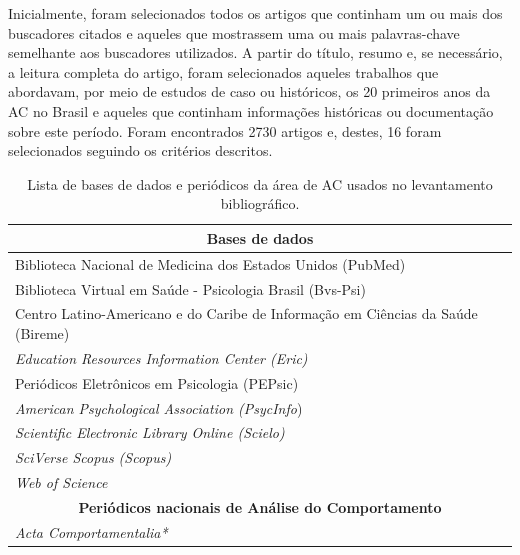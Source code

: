 Inicialmente, foram selecionados todos os artigos que continham um ou mais dos buscadores citados e aqueles que mostrassem uma ou mais palavras-chave semelhante aos buscadores utilizados. A partir do título, resumo e, se necessário, a leitura completa do artigo, foram selecionados aqueles trabalhos que abordavam, por meio de estudos de caso ou históricos, os 20 primeiros anos da AC no Brasil e aqueles que continham informações históricas ou documentação sobre este período. Foram encontrados 2730 artigos e, destes, 16 foram selecionados seguindo os critérios descritos.

\begin{table}[tbp]
    \caption{Lista de bases de dados e periódicos da área de AC usados no levantamento bibliográfico.}
    \label{tabela011}
    \begin{adjustbox}{max width=1\textwidth}
    \begin{tabular}{@{}l@{}}
    \toprule
    \multicolumn{1}{c}{\textbf{Bases de dados}}                                     \\ \midrule
    Biblioteca Nacional de Medicina dos Estados Unidos (PubMed)                     \\
    Biblioteca Virtual em Saúde - Psicologia Brasil (Bvs-Psi)                       \\
    Centro Latino-Americano e do Caribe de Informação em Ciências da	Saúde (Bireme) \\
    \textit{Education Resources Information Center  (Eric)}                                  \\
    Periódicos Eletrônicos em Psicologia (PEPsic)                                   \\
    \textit{American Psychological Association (PsycInfo})                                   \\
    \textit{Scientific	Electronic Library Online (Scielo) }                                  \\
    \textit{SciVerse Scopus (Scopus)}                                                        \\
    \textit{Web	of Science}                                                               \\ \midrule
    \multicolumn{1}{c}{\textbf{Periódicos nacionais de Análise do Comportamento}}   \\ \midrule
    \textit{\textit{Acta Comportamentalia*}}                                                 \\

\end{tabular}
\end{adjustbox}
\end{table}
